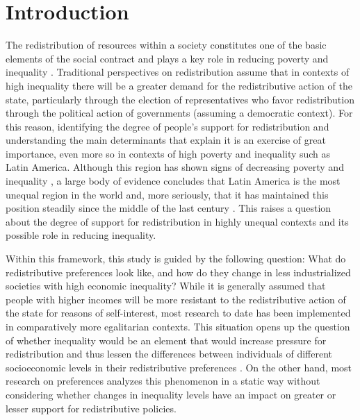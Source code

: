 \documentclass[utf8]{frontiersSCNS} %
\begin{document}
\section{Introduction}

The redistribution of resources within a society constitutes one of the basic elements of the social contract and plays a key role in reducing poverty and inequality \parencite{HoffmanLopsidedContinentInequality2003}. Traditional perspectives on redistribution assume that in contexts of high inequality there will be a greater demand for the redistributive action of the state, particularly through the election of representatives who favor redistribution through the political action of governments (assuming a democratic context). For this reason, identifying the degree of people’s support for redistribution and understanding the main determinants that explain it is an exercise of great importance, even more so in contexts of high poverty and inequality such as Latin America. Although this region has shown signs of decreasing poverty and inequality \parencite{LustigDecliningInequalityLatin2013, Dayton-Johnson2015}, a large body of evidence concludes that Latin America is the most unequal region in the world \parencite{Bertola2009, WilliamsonLatinAmericanInequality2015, CEPALPanoramaSocialAmerica2016} and, more seriously, that it has maintained this position steadily since the middle of the last century \parencite{MannExplainingmacroregionaltrends2007}. This raises a question about the degree of support for redistribution in highly unequal contexts and its possible role in reducing inequality.

Within this framework, this study is guided by the following question: What do redistributive preferences look like, and how do they change in less industrialized societies with high economic inequality? While it is generally assumed that people with higher incomes will be more resistant to the redistributive action of the state for reasons of self-interest, most research to date has been implemented in comparatively more egalitarian contexts. This situation opens up the question of whether inequality would be an element that would increase pressure for redistribution and thus lessen the differences between individuals of different socioeconomic levels in their redistributive preferences \parencite{Dimick2016,Dimick2018}. On the other hand, most research on preferences analyzes this phenomenon in a static way without considering whether changes in inequality levels have an impact on greater or lesser support for redistributive policies.
\end{document}
